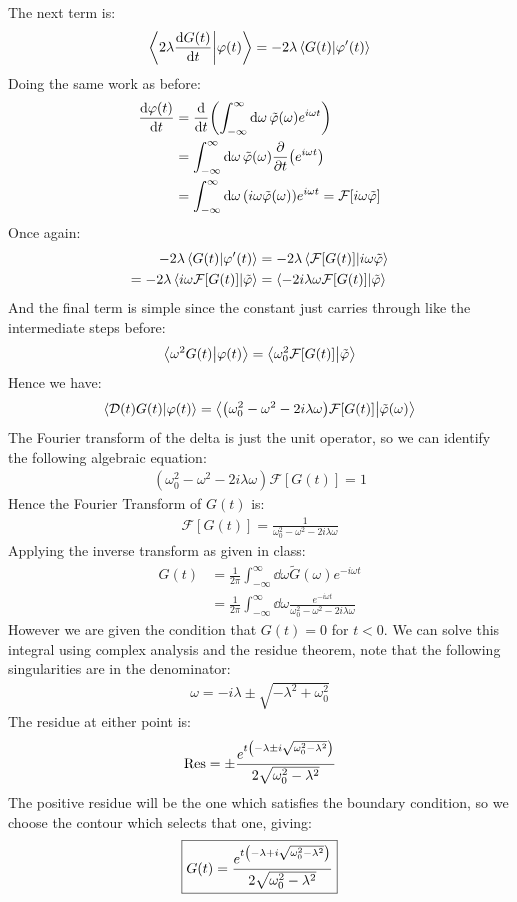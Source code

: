 \documentclass[12pt]{article}
\newcommand{\F}{\mathcal{F}}
\newcommand{\mcD}{\mathcal{D}}
\newcommand{\vphi}{\varphi}
\newcommand{\vtphi}{\tilde{\varphi}}
\begin{document}
The next term is:
\begin{align*}
  \ip{2\lambda\dv{G(t)}{t}}{\vphi(t)}=-2\lambda\ip{G(t)}{\vphi'(t)}
\end{align*}
Doing the same work as before:
\begin{align*}
  \dv{\vphi(t)}{t}&=\dv{t}\qty(
  \int_{-\infty}^\infty\dd{\omega}\vtphi(\omega)e^{i\omega t})\\
  &=\int_{-\infty}^\infty\dd{\omega}
  \vtphi(\omega)\pdv{t}\qty(e^{i\omega t})\\
  &=\int_{-\infty}^\infty\dd{\omega}
  \qty(i\omega\vtphi(\omega)) e^{i\omega t}=\F[i\omega\vtphi]
\end{align*}
Once again:
\begin{align*}
  -2\lambda\ip{G(t)}{\vphi'(t)}&=-2\lambda\ip{\F[G(t)]}{i\omega\vtphi}\\
  =-2\lambda\ip{i\omega\F[G(t)]}{\vtphi}&=\ip{-2i\lambda\omega\F[G(t)]}{\vtphi}
\end{align*}
And the final term is simple since the constant just carries through like the intermediate steps before:
\begin{align*}
  \ip{\omega^2G(t)}{\vphi(t)}=\ip{\omega_0^2\F[G(t)]}{\vtphi}
\end{align*}
Hence we have:
\begin{align*}
  \ip{\mcD(t)G(t)}{\vphi(t)}=
  \ip{\qty(\omega_0^2-\omega^2-2i\lambda\omega)\F[G(t)]}{\vtphi(\omega)}
\end{align*}
The Fourier transform of the delta is just the unit operator, so we can identify the following algebraic equation:
\begin{align*}
  (\omega_0^2-\omega^2-2i\lambda\omega)\F[G(t)]=1
\end{align*}
Hence the Fourier Transform of $G(t)$ is:
\begin{align*}
  \F[G(t)]=\frac1{\omega_0^2-\omega^2-2i\lambda\omega}
\end{align*}
Applying the inverse transform as given in class:
\begin{align*}
  G(t)&=\frac1{2\pi}\int_{-\infty}^\infty
  \dd{\omega}\tilde{G}(\omega)e^{-i\omega t}\\
  &=\frac1{2\pi}\int_{-\infty}^\infty\dd{\omega}
  \frac{e^{-i\omega t}}{\omega_0^2-\omega^2-2i\lambda\omega}
\end{align*}
However we are given the condition that $G(t)=0$ for $t<0$. We can solve this integral using complex analysis and the residue theorem, note that the following singularities are in the denominator:
\begin{align*}
  \omega=-i\lambda\pm\sqrt{-\lambda^2+\omega_0^2}
\end{align*}
The residue at either point is:
\begin{align*}
  \mathrm{Res}=\pm\frac{e^{t\qty(-\lambda \pm i\sqrt{\omega_0^2-\lambda^2})}}
  {2\sqrt{\omega_0^2-\lambda^2}}
\end{align*}
The positive residue will be the one which satisfies the boundary condition, so we choose the contour which selects that one, giving:
\begin{align}
  \boxed{G(t)=\frac{e^{t\qty(-\lambda+i\sqrt{\omega_0^2-\lambda^2})}}
  {2\sqrt{\omega_0^2-\lambda^2}}}
\end{align}
\end{document}
